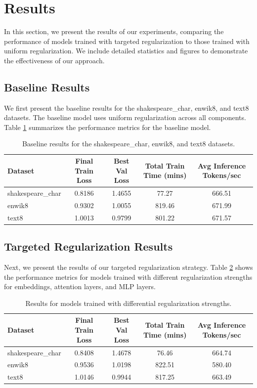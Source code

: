 \documentclass{article} %
\begin{document}
\section{Results}
\label{sec:results}

In this section, we present the results of our experiments, comparing the performance of models trained with targeted regularization to those trained with uniform regularization. We include detailed statistics and figures to demonstrate the effectiveness of our approach.

\subsection{Baseline Results}
We first present the baseline results for the shakespeare\_char, enwik8, and text8 datasets. The baseline model uses uniform regularization across all components. Table \ref{tab:baseline_results} summarizes the performance metrics for the baseline model.

\begin{table}[h]
    \centering
    \begin{tabular}{lcccc}
        \toprule
        Dataset & Final Train Loss & Best Val Loss & Total Train Time (mins) & Avg Inference Tokens/sec \\
        \midrule
        shakespeare\_char & 0.8186 & 1.4655 & 77.27 & 666.51 \\
        enwik8 & 0.9302 & 1.0055 & 819.46 & 671.99 \\
        text8 & 1.0013 & 0.9799 & 801.22 & 671.57 \\
        \bottomrule
    \end{tabular}
    \caption{Baseline results for the shakespeare\_char, enwik8, and text8 datasets.}
    \label{tab:baseline_results}
\end{table}

\subsection{Targeted Regularization Results}
Next, we present the results of our targeted regularization strategy. Table \ref{tab:diff_reg_results} shows the performance metrics for models trained with different regularization strengths for embeddings, attention layers, and MLP layers.

\begin{table}[h]
    \centering
    \begin{tabular}{lcccc}
        \toprule
        Dataset & Final Train Loss & Best Val Loss & Total Train Time (mins) & Avg Inference Tokens/sec \\
        \midrule
        shakespeare\_char & 0.8408 & 1.4678 & 76.46 & 664.74 \\
        enwik8 & 0.9536 & 1.0198 & 822.51 & 580.40 \\
        text8 & 1.0146 & 0.9944 & 817.25 & 663.49 \\
        \bottomrule
    \end{tabular}
    \caption{Results for models trained with differential regularization strengths.}
    \label{tab:diff_reg_results}
\end{table}
\end{document}
